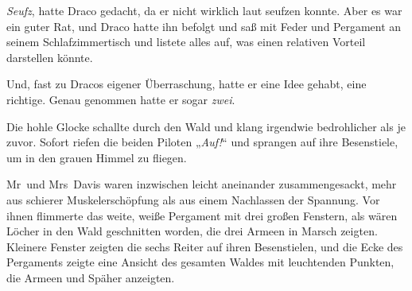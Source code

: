 \emph{Seufz}, hatte Draco gedacht, da er nicht wirklich laut seufzen konnte. Aber es war ein guter Rat, und Draco hatte ihn befolgt und saß mit Feder und Pergament an seinem Schlafzimmertisch und listete alles auf, was einen relativen Vorteil darstellen könnte.

Und, fast zu Dracos eigener Überraschung, hatte er eine Idee gehabt, eine richtige. Genau genommen hatte er sogar \emph{zwei}.

Die hohle Glocke schallte durch den Wald und klang irgendwie bedrohlicher als je zuvor. Sofort riefen die beiden Piloten
„\emph{Auf!}“ und sprangen auf ihre Besenstiele, um in den grauen Himmel zu fliegen.

\later

Mr~und Mrs~Davis waren inzwischen leicht aneinander zusammengesackt, mehr aus schierer Muskelerschöpfung als aus einem Nachlassen der Spannung. Vor ihnen flimmerte das weite, weiße Pergament mit drei großen Fenstern, als wären Löcher in den Wald geschnitten worden, die drei Armeen in Marsch zeigten. Kleinere Fenster zeigten die sechs Reiter auf ihren Besenstielen, und die Ecke des Pergaments zeigte eine Ansicht des gesamten Waldes mit leuchtenden Punkten, die Armeen und Späher anzeigten.

